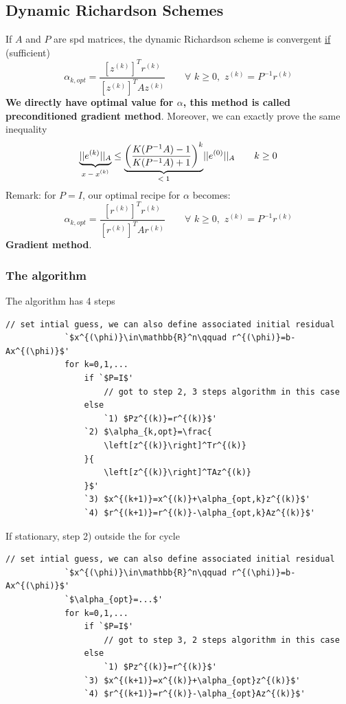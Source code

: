 \subsection{Dynamic Richardson Schemes}
    If $A$ and $P$ are spd matrices, the dynamic Richardson scheme is convergent \underline{if} (sufficient)
    $$
    \alpha_{k,opt}=\frac{
        \left[z^{(k)}\right]^Tr^{(k)}
    }{
        \left[z^{(k)}\right]^TAz^{(k)}
    }\qquad\forall\,\,k\geq 0,\,\,z^{(k)}=P^{-1}r^{(k)}
    $$
    \textbf{We directly have optimal value for $\alpha$, this method is called preconditioned gradient method}. Moreover, we can exactly prove the same inequality
    $$
    \underlabel{||e^{(k)}||_A}{$x-x^{(k)}$}\leq
    \underlabel{
        \left(
            \frac{
                K(P^{-1}A)-1
            }{
                K(P^{-1}A)+1
            }
        \right)^k
    }{
        $<1$
    }||e^{(0)}||_A
    \qquad k\geq 0
    $$
    Remark: for $P=I$, our optimal recipe for $\alpha$ becomes:
    $$
    \alpha_{k,opt}=\frac{
        \left[r^{(k)}\right]^Tr^{(k)}
    }{
        \left[r^{(k)}\right]^TAr^{(k)}
    }\qquad\forall\,\,k\geq 0,\,\,z^{(k)}=P^{-1}r^{(k)}
    $$
    \textbf{Gradient method}.
    \subsubsection{The algorithm}
    The algorithm has 4 steps
    \begin{center}
        \begin{lstlisting}[escapeinside=`']
            // set intial guess, we can also define associated initial residual
            `$x^{(\phi)}\in\mathbb{R}^n\qquad r^{(\phi)}=b-Ax^{(\phi)}$'
            for k=0,1,...
                if `$P=I$'
                    // got to step 2, 3 steps algorithm in this case
                else
                    `1) $Pz^{(k)}=r^{(k)}$'
                `2) $\alpha_{k,opt}=\frac{
                    \left[z^{(k)}\right]^Tr^{(k)}
                }{
                    \left[z^{(k)}\right]^TAz^{(k)}
                }$'
                `3) $x^{(k+1)}=x^{(k)}+\alpha_{opt,k}z^{(k)}$'
                `4) $r^{(k+1)}=r^{(k)}-\alpha_{opt,k}Az^{(k)}$'
        \end{lstlisting}
    \end{center}
    If stationary, step 2) outside the for cycle
    \begin{center}
        \begin{lstlisting}[escapeinside=`']
            // set intial guess, we can also define associated initial residual
            `$x^{(\phi)}\in\mathbb{R}^n\qquad r^{(\phi)}=b-Ax^{(\phi)}$'
            `$\alpha_{opt}=...$'
            for k=0,1,...
                if `$P=I$'
                    // got to step 3, 2 steps algorithm in this case
                else
                    `1) $Pz^{(k)}=r^{(k)}$'
                `3) $x^{(k+1)}=x^{(k)}+\alpha_{opt}z^{(k)}$'
                `4) $r^{(k+1)}=r^{(k)}-\alpha_{opt}Az^{(k)}$'
        \end{lstlisting}
    \end{center}
